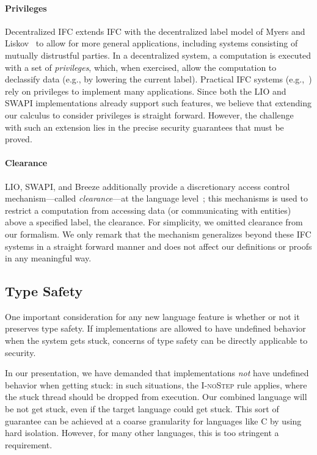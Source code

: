 \paragraph{Privileges}
Decentralized IFC extends IFC with the decentralized label model of
Myers and Liskov~\cite{myers:dlm} to allow for more general
applications, including systems consisting of mutually distrustful
parties.  In a decentralized system, a computation is executed with a
set of \emph{privileges}, which, when exercised, allow the computation
to declassify data (e.g., by lowering the current label).
%
Practical IFC systems
(e.g.,~\cite{Zeldovich:2006, lio,
Hritcu:2013:YIB:2497621.2498098, myers:jif}) rely on privileges to
implement many applications.
%
Since both the LIO and SWAPI implementations already support such features,
we believe that extending our calculus to consider privileges is
straight forward.
%
However, the challenge with such an extension lies in the precise
security guarantees that must be proved.
%

\paragraph{Clearance}
%
LIO, SWAPI, and Breeze additionally provide a discretionary access
control mechanism---called \emph{clearance}---at the language
level~\cite{Hritcu:2013:YIB:2497621.2498098, lio}; this mechanisms is
used to restrict a computation from accessing data (or communicating
with entities) above a specified label, the clearance.
%
For simplicity, we omitted clearance from our formalism.
%
We only remark that the mechanism generalizes beyond these IFC systems
in a straight forward manner and does not affect our definitions or
proofs in any meaningful way.


\subsection{Type Safety}
\label{sec:extensions:types}

One important consideration for any new language feature is whether
or not it preserves type safety.  If implementations are allowed to
have undefined behavior when the system gets stuck, concerns of type
safety can be directly applicable to security.

In our presentation, we have demanded that implementations \emph{not}
have undefined behavior when getting stuck: in such situations, the
\textsc{I-noStep} rule applies, where the stuck thread should be dropped
from execution.  Our combined language will be not get stuck, even if
the target language could get stuck.  This sort of guarantee can be
achieved at a coarse granularity for languages like C by using hard
isolation.  However, for many other languages, this is too stringent a
requirement.

